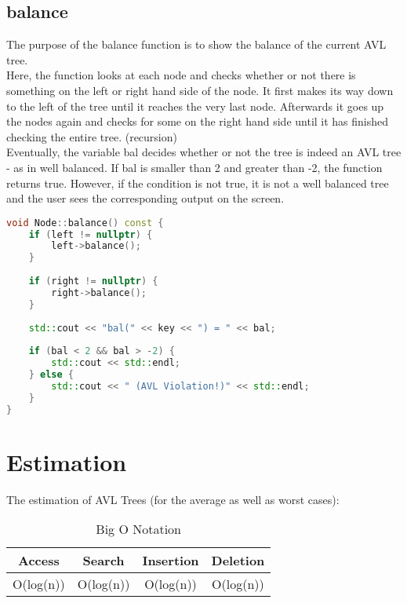 \documentclass[12pt]{article}
\begin{document}
\subsection{balance}
The purpose of the balance function is to show the balance of the current AVL tree.\\ Here, the function looks at each node and checks whether or not there is something on the left or right hand side of the node. It first makes its way down to the left of the tree until it reaches the very last node. Afterwards it goes up the nodes again and checks for some on the right hand side until it has finished checking the entire tree. (recursion)\\ Eventually, the variable bal decides whether or not the tree is indeed an AVL tree - as in well balanced. If bal is smaller than 2 and greater than -2, the function returns true. However, if the condition is not true, it is not a well balanced tree and the user sees the corresponding output on the screen.

\begin{lstlisting}[language=C++, caption=Balance function]
void Node::balance() const {
    if (left != nullptr) {
        left->balance();
    }
    
    if (right != nullptr) {
        right->balance();
    }
    
    std::cout << "bal(" << key << ") = " << bal;
    
    if (bal < 2 && bal > -2) {
        std::cout << std::endl;
    } else {
        std::cout << " (AVL Violation!)" << std::endl;
    }
}
\end{lstlisting}

\section{Estimation}
The estimation of AVL Trees (for the average as well as worst cases):\\
\begin{table}[h!]
\centering
\label{tab:table1}
	\begin{tabular}{c|c|c|c}
	Access & Search & Insertion & Deletion \\
	\hline
	O(log(n)) & O(log(n)) & O(log(n)) & O(log(n)) \\
	\end{tabular}\\
\caption{Big O Notation}
\end{table}
\end{document}
